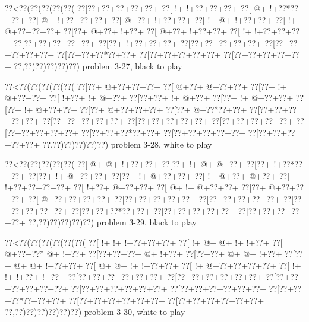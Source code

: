 \vbox{\vbox{\goo
\0??<\0??(\0??(\0??(\0??(\0??(
\0??[\0??+\0??+\0??+\0??+\0??+
\0??[\- !+\- !+\0??+\0??+\0??+
\0??[\- @+\- !+\0??*\0??+\0??+
\0??[\- @+\- !+\0??+\0??+\0??+
\0??[\- @+\0??+\- !+\0??+\0??+
\0??[\- !+\- @+\- !+\0??+\0??+
\0??[\- !+\- @+\0??+\0??+\0??+
\0??[\0??+\- @+\0??+\- !+\0??+
\0??[\- @+\0??+\- !+\0??+\0??+
\0??[\- !+\- !+\0??+\0??+\0??+
\0??[\0??+\0??+\0??+\0??+\0??+
\0??[\0??+\- !+\0??+\0??+\0??+
\0??[\0??+\0??+\0??+\0??+\0??+
\0??[\0??+\0??+\0??+\0??+\0??+
\0??[\0??+\0??+\0??*\0??+\0??+
\0??[\0??+\0??+\0??+\0??+\0??+
\0??[\0??+\0??+\0??+\0??+\0??+
\0??,\0??)\0??)\0??)\0??)\0??)
}
\hfil problem 3-27, black to play\hfil\break
}

\vbox{\vbox{\goo
\0??<\0??(\0??(\0??(\0??(\0??(
\0??[\0??+\- @+\0??+\0??+\0??+
\0??[\- @+\0??+\- @+\0??+\0??+
\0??[\0??+\- !+\- @+\0??+\0??+
\0??[\- !+\0??+\- !+\- @+\0??+
\0??[\0??+\0??+\- !+\- @+\0??+
\0??[\0??+\- !+\- @+\0??+\0??+
\0??[\0??+\- !+\- @+\0??+\0??+
\0??[\0??+\- @+\0??+\0??+\0??+
\0??[\0??+\- @+\0??*\0??+\0??+
\0??[\0??+\0??+\0??+\0??+\0??+
\0??[\0??+\0??+\0??+\0??+\0??+
\0??[\0??+\0??+\0??+\0??+\0??+
\0??[\0??+\0??+\0??+\0??+\0??+
\0??[\0??+\0??+\0??+\0??+\0??+
\0??[\0??+\0??+\0??*\0??+\0??+
\0??[\0??+\0??+\0??+\0??+\0??+
\0??[\0??+\0??+\0??+\0??+\0??+
\0??,\0??)\0??)\0??)\0??)\0??)
}
\hfil problem 3-28, white to play\hfil\break
}

\vbox{\vbox{\goo
\0??<\0??(\0??(\0??(\0??(\0??(
\0??[\- @+\- @+\- !+\0??+\0??+
\0??[\0??+\- !+\- @+\- @+\0??+
\0??[\0??+\- !+\0??*\0??+\0??+
\0??[\0??+\- !+\- @+\0??+\0??+
\0??[\0??+\- !+\- @+\0??+\0??+
\0??[\- !+\- @+\0??+\- @+\0??+
\0??[\- !+\0??+\0??+\0??+\0??+
\0??[\- !+\0??+\- @+\0??+\0??+
\0??[\- @+\- !+\- @+\0??+\0??+
\0??[\0??+\- @+\0??+\0??+\0??+
\0??[\- @+\0??+\0??+\0??+\0??+
\0??[\0??+\0??+\0??+\0??+\0??+
\0??[\0??+\0??+\0??+\0??+\0??+
\0??[\0??+\0??+\0??+\0??+\0??+
\0??[\0??+\0??+\0??*\0??+\0??+
\0??[\0??+\0??+\0??+\0??+\0??+
\0??[\0??+\0??+\0??+\0??+\0??+
\0??,\0??)\0??)\0??)\0??)\0??)
}
\hfil problem 3-29, black to play\hfil\break
}

\vbox{\vbox{\goo
\0??<\0??(\0??(\0??(\0??(\0??(\0??(
\0??[\- !+\- !+\- !+\0??+\0??+\0??+
\0??[\- !+\- @+\- @+\- !+\- !+\0??+
\0??[\- @+\0??+\0??*\- @+\- !+\0??+
\0??[\0??+\0??+\0??+\- @+\- !+\0??+
\0??[\0??+\0??+\- @+\- @+\- !+\0??+
\0??[\0??+\- @+\- @+\- !+\0??+\0??+
\0??[\- @+\- @+\- !+\- !+\0??+\0??+
\0??[\- !+\- @+\0??+\0??+\0??+\0??+
\0??[\- !+\- !+\- !+\0??+\- !+\0??+
\0??[\0??+\0??+\0??+\0??+\0??+\0??+
\0??[\0??+\0??+\0??+\0??+\0??+\0??+
\0??[\0??+\0??+\0??+\0??+\0??+\0??+
\0??[\0??+\0??+\0??+\0??+\0??+\0??+
\0??[\0??+\0??+\0??+\0??+\0??+\0??+
\0??[\0??+\0??+\0??*\0??+\0??+\0??+
\0??[\0??+\0??+\0??+\0??+\0??+\0??+
\0??[\0??+\0??+\0??+\0??+\0??+\0??+
\0??,\0??)\0??)\0??)\0??)\0??)\0??)
}
\hfil problem 3-30, white to play\hfil\break
}

